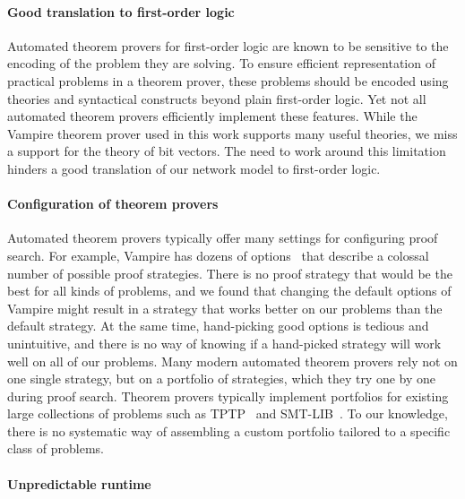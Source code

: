 \paragraph{Good translation to first-order logic}
Automated theorem provers for first-order logic are known to be sensitive to the encoding of the problem they are solving. To ensure efficient representation of practical problems in a theorem prover, these problems should be encoded using theories and syntactical constructs beyond plain first-order logic. Yet not all automated theorem provers efficiently implement these features. While the Vampire theorem prover used in this work supports many useful theories, we miss a support for the theory of bit vectors. The need to work around this limitation hinders a good translation of our network model to first-order logic. %


\paragraph{Configuration of theorem provers}
Automated theorem provers typically offer many settings for configuring proof search. For example, Vampire has dozens of options~\cite{DBLP:conf/cade/Reger0V14} that describe a colossal number of possible proof strategies. There is no proof strategy that would be the best for all kinds of problems, and we found that changing the default options of Vampire might result in a strategy that works better on our problems than the default strategy. At the same time, hand-picking good options is tedious and unintuitive, and there is no way of knowing if a hand-picked strategy will work well on all of our problems. Many modern automated theorem provers rely not on one single strategy, but on a portfolio of strategies, which they try one by one during proof search. Theorem provers typically implement portfolios for existing large collections of problems such as TPTP~\cite{TPTP} and SMT-LIB~\cite{SMT-LIB}. To our knowledge, there is no systematic way of assembling a custom portfolio tailored to a specific class of problems.

\paragraph{Unpredictable runtime}

